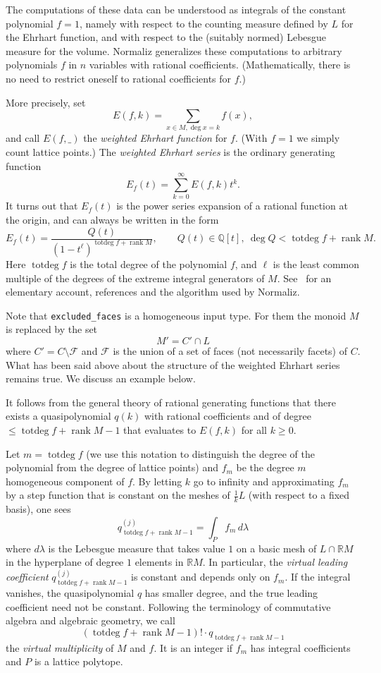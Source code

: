 \documentclass[12pt,a4paper]{scrartcl}
\theoremstyle{definition}
\def\QQ{{\mathbb Q}}
\def\RR{{\mathbb R}}
\DeclareMathOperator{\rank}{rank}
\DeclareMathOperator{\totdeg}{totdeg}
\begin{document}
The computations of these data can be understood as integrals of the
constant polynomial $f=1$, namely with respect to the counting
measure defined by $L$ for the Ehrhart function, and with
respect to the (suitably normed) Lebesgue measure for the
volume. Normaliz generalizes these computations to
arbitrary polynomials $f$ in $n$ variables with rational
coefficients. (Mathematically, there is no need to restrict
oneself to rational coefficients for $f$.)

More precisely, set
$$
E(f,k)=\sum_{x\in M, \deg x=k} f(x),
$$
and call $E(f,\_)$ the \emph{weighted Ehrhart function} for
$f$. (With $f=1$ we simply count lattice points.) The
\emph{weighted Ehrhart series} is the ordinary generating
function
$$
E_f(t)=\sum_{k=0}^\infty E(f,k)t^k.
$$
It turns out that $E_f(t)$ is the power series expansion of a
rational function at the origin, and can always be written in
the form
$$
E_f(t)=\frac{Q(t)}{(1-t^\ell)^{\totdeg f+\rank M}},\qquad Q(t)\in\QQ[t],\
\deg Q< \totdeg f+\rank M.
$$
Here $\totdeg f$ is the total degree of the polynomial $f$, and
$\ell$ is the least common multiple of the degrees of the
extreme integral generators of $M$. See~\cite{BS} for an
elementary account, references and the algorithm used by Normaliz.

Note that \verb|excluded_faces| is a homogeneous input type. For them the monoid $M$ is replaced by the set
$$
M'=C'\cap L
$$
where $C'=C\setminus \mathcal F$ and $\mathcal F$ is the union of a set of
faces
(not necessarily facets) of $C$. What has been said above about the structure
of the weighted Ehrhart series remains true. We discuss an example below.

It follows from the general theory of rational generating
functions that there exists a quasipolynomial $q(k)$ with
rational coefficients and of degree $\le \totdeg f+\rank M-1$ that
evaluates to $E(f,k)$ for all $k\ge 0$.

Let $m=\totdeg f$ (we use this notation to distinguish the degree of the polynomial from the degree of lattice points) and $f_m$ be the degree $m$ homogeneous
component of $f$. By letting $k$ go to infinity and
approximating $f_m$ by a step function that is constant on the
meshes of $\frac 1kL$ (with respect to a fixed basis), one sees
$$
q^{(j)}_{\totdeg f+\rank M-1}=\int_P f_m\, d\lambda
$$
where $d\lambda$ is the Lebesgue measure that takes value $1$
on a basic mesh of $L\cap \RR M$ in the hyperplane of degree
$1$ elements in $\RR M$. In particular, the \emph{virtual
	leading coefficient} $q^{(j)}_{\totdeg f+\rank M-1}$ is
constant and depends only on $f_m$. If the integral vanishes,
the quasipolynomial $q$ has smaller degree, and the true
leading coefficient need not be constant. Following the
terminology of commutative algebra and algebraic geometry, we
call
$$
(\totdeg f+\rank M-1)!\cdot q_{\totdeg f+\rank M-1}
$$
the \emph{virtual multiplicity} of $M$ and $f$. It is an
integer if $f_m$ has integral coefficients and $P$ is a lattice
polytope.
\end{document}
